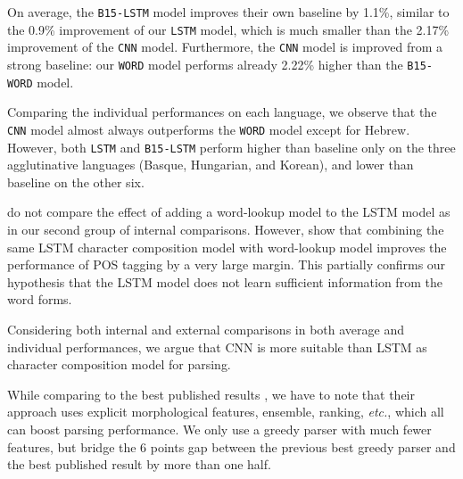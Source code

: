 \documentclass[11pt,a4paper]{article}
\begin{document}
    On average, the \texttt{B15-LSTM} model improves their own baseline by 1.1\%, similar to the 0.9\% improvement of our \texttt{LSTM} model, which is much smaller than the 2.17\% improvement of the \texttt{CNN} model.
    Furthermore, the \texttt{CNN} model is improved from a strong baseline: our \texttt{WORD} model performs already 2.22\% higher than the \texttt{B15-WORD} model.

    Comparing the individual performances on each language, we observe that the \texttt{CNN} model almost always outperforms the \texttt{WORD} model except for Hebrew.
    However, both \texttt{LSTM} and \texttt{B15-LSTM} perform higher than baseline only on the three agglutinative languages (Basque, Hungarian, and Korean), and lower than baseline on the other six. 

    \citet{Ballesteros:2015} do not compare the effect of adding a word-lookup model to the LSTM model as in our second group of internal comparisons. However, \citet{Plank:2016} show that combining the same LSTM character composition model with word-lookup model improves the performance of POS tagging by a very large margin. This partially confirms our hypothesis that the LSTM model does not learn sufficient information from the word forms.


    Considering both internal and external comparisons in both average and individual performances, we argue that CNN is more suitable than LSTM as character composition model for parsing.

    While comparing to the best published results \citep{Bjorkelund:2013, Bjorkelund:2014}, we have to note that their approach uses explicit morphological features, ensemble, ranking, 
    {\em etc.}, which all can boost parsing performance. 
    We only use a greedy parser with much fewer features, but bridge the 6 points gap between the previous best greedy parser and the best published result by more than one half.


\end{document}
